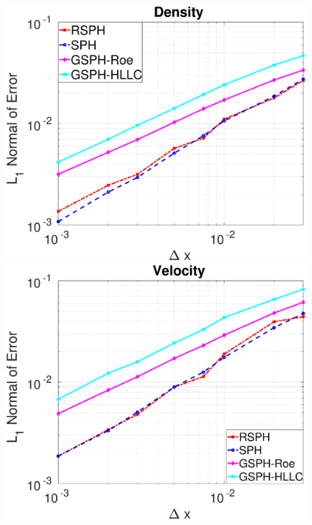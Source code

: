 \begin{figure}
    \centering
    \begin{minipage}{.332\textwidth}
        \centering
        \includegraphics[width=0.99 \textwidth]{./Chapter-4/Figures/Accuracy-des}
    \end{minipage}%
    \begin{minipage}{.332 \textwidth}
        \centering
        \includegraphics[width=0.99 \textwidth]{./Chapter-4/Figures/Accuracy-vel}
    \end{minipage}%

\end{figure}
